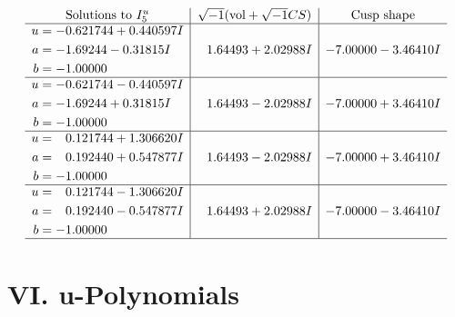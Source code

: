 \documentclass[1p]{elsarticle_modified}
\theoremstyle{definition}
\newcommand{\I}{\sqrt{-1}}
\begin{document}
$$\begin{array}{c|c|c}  
\text{Solutions to }I^u_{5}& \I (\text{vol} + \sqrt{-1}CS) & \text{Cusp shape}\\
 \hline 
\begin{aligned}
u &= -0.621744 + 0.440597 I \\
a &= -1.69244 - 0.31815 I \\
b &= -1.00000\phantom{ +0.000000I}\end{aligned}
 & \phantom{-}1.64493 + 2.02988 I & -7.00000 - 3.46410 I \\ \hline\begin{aligned}
u &= -0.621744 - 0.440597 I \\
a &= -1.69244 + 0.31815 I \\
b &= -1.00000\phantom{ +0.000000I}\end{aligned}
 & \phantom{-}1.64493 - 2.02988 I & -7.00000 + 3.46410 I \\ \hline\begin{aligned}
u &= \phantom{-}0.121744 + 1.306620 I \\
a &= \phantom{-}0.192440 + 0.547877 I \\
b &= -1.00000\phantom{ +0.000000I}\end{aligned}
 & \phantom{-}1.64493 - 2.02988 I & -7.00000 + 3.46410 I \\ \hline\begin{aligned}
u &= \phantom{-}0.121744 - 1.306620 I \\
a &= \phantom{-}0.192440 - 0.547877 I \\
b &= -1.00000\phantom{ +0.000000I}\end{aligned}
 & \phantom{-}1.64493 + 2.02988 I & -7.00000 - 3.46410 I\\
 \hline 
 \end{array}$$\newpage
\newpage\renewcommand{\arraystretch}{1}
\centering \section*{ VI. u-Polynomials}
\end{document}
